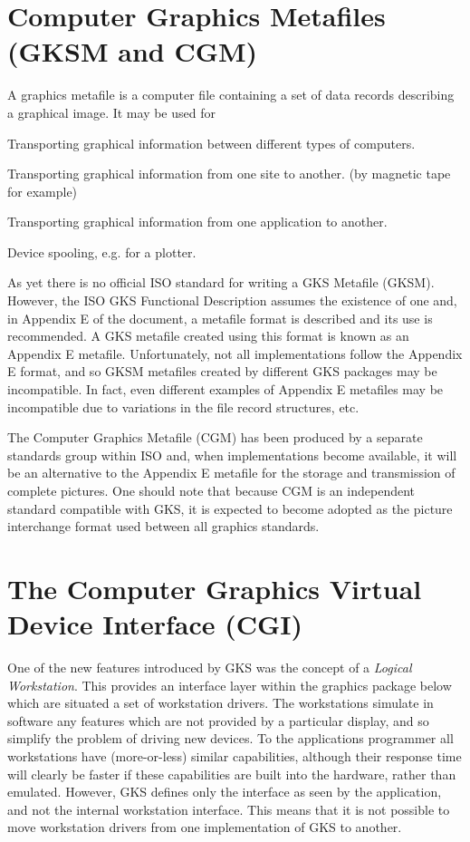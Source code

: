 \section{\protect\label{sec:metint}Computer Graphics Metafiles (GKSM and CGM)}
 
A graphics metafile is a computer file containing a set of data records
describing a graphical image. It may be used for
\begin{OL}
\item Transporting graphical information between different types of computers.
\item Transporting graphical information from one site to another.
(by magnetic tape for example)
\item Transporting graphical information from one application to another.
\item Device spooling, e.g. for a plotter.
\end{OL}
 
As yet there is no official ISO standard for writing a GKS Metafile (GKSM).
However, the ISO GKS Functional Description assumes the existence of one and,
in Appendix E of the document, a metafile format is described
and its use is recommended.
A GKS metafile created using this format is known as an Appendix E metafile.
Unfortunately, not all implementations follow the Appendix E format,
and so GKSM metafiles created by different GKS packages may be incompatible.
In fact, even different examples of Appendix E metafiles may be
incompatible due to variations in the file record structures, etc.
 
The Computer Graphics Metafile (CGM) has been produced by a separate
standards group within ISO and, when implementations become available,
it will be an alternative to the Appendix E metafile for the storage
and transmission of complete pictures.
One should note that because CGM is an independent standard
compatible with GKS, it is expected to become adopted as the
picture interchange format used between all graphics standards.
\section{The Computer Graphics Virtual Device Interface (CGI)}
 
One of the new features introduced by GKS was the concept of a
{\it Logical Workstation}.
This provides an interface layer within the graphics package below
which are situated a set of workstation drivers.
The workstations simulate in software any features which are not provided
by a particular display, and so simplify the problem of driving
new devices. To the applications programmer all workstations
have (more-or-less) similar capabilities, although their response
time will clearly be faster if these capabilities are built into the hardware,
rather than emulated. However, GKS defines only the interface as
seen by the application, and not the internal workstation interface.
This means that it is not possible to move workstation drivers
from one implementation of GKS to another.
 

